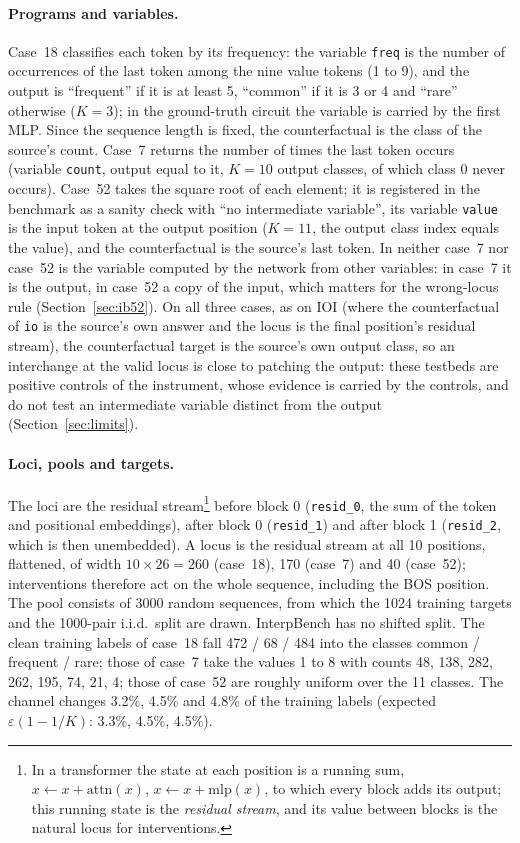 \documentclass[11pt,a4paper]{article}
\begin{document}
\paragraph{Programs and variables.} Case~18 classifies each token by its frequency: the variable \texttt{freq} is the number of occurrences of the last token among the nine value tokens (1 to 9), and the output is ``frequent'' if it is at least 5, ``common'' if it is 3 or 4 and ``rare'' otherwise ($K=3$); in the ground-truth circuit the variable is carried by the first MLP. Since the sequence length is fixed, the counterfactual is the class of the source's count. Case~7 returns the number of times the last token occurs (variable \texttt{count}, output equal to it, $K=10$ output classes, of which class 0 never occurs). Case~52 takes the square root of each element; it is registered in the benchmark as a sanity check with ``no intermediate variable'', its variable \texttt{value} is the input token at the output position ($K=11$, the output class index equals the value), and the counterfactual is the source's last token. In neither case~7 nor case~52 is the variable computed by the network from other variables: in case~7 it is the output, in case~52 a copy of the input, which matters for the wrong-locus rule (Section~\ref{sec:ib52}). On all three cases, as on IOI (where the counterfactual of \texttt{io} is the source's own answer and the locus is the final position's residual stream), the counterfactual target is the source's own output class, so an interchange at the valid locus is close to patching the output: these testbeds are positive controls of the instrument, whose evidence is carried by the controls, and do not test an intermediate variable distinct from the output (Section~\ref{sec:limits}).

\paragraph{Loci, pools and targets.} The loci are the residual stream\footnote{In a transformer the state at each position is a running sum, $x\leftarrow x+\mathrm{attn}(x)$, $x\leftarrow x+\mathrm{mlp}(x)$, to which every block adds its output; this running state is the \emph{residual stream}, and its value between blocks is the natural locus for interventions.} before block 0 (\texttt{resid\_0}, the sum of the token and positional embeddings), after block 0 (\texttt{resid\_1}) and after block 1 (\texttt{resid\_2}, which is then unembedded). A locus is the residual stream at all 10 positions, flattened, of width $10\times26=260$ (case~18), 170 (case~7) and 40 (case~52); interventions therefore act on the whole sequence, including the BOS position. The pool consists of 3000 random sequences, from which the 1024 training targets and the 1000-pair i.i.d.\ split are drawn. InterpBench has no shifted split. The clean training labels of case~18 fall 472 / 68 / 484 into the classes common / frequent / rare; those of case~7 take the values 1 to 8 with counts 48, 138, 282, 262, 195, 74, 21, 4; those of case~52 are roughly uniform over the 11 classes. The channel changes 3.2\%, 4.5\% and 4.8\% of the training labels (expected $\varepsilon(1-1/K)$: 3.3\%, 4.5\%, 4.5\%).
\end{document}
